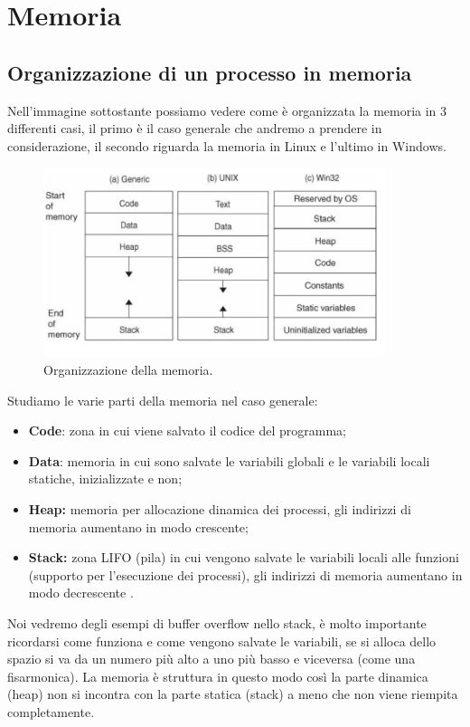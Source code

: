\section{Memoria}
\subsection{Organizzazione di un processo in memoria}
Nell'immagine sottostante possiamo vedere come è organizzata la memoria in 3 differenti casi, il primo è il caso generale che andremo a prendere in considerazione, il secondo riguarda la memoria in Linux e l'ultimo in Windows.

\begin{figure}[H]
    \centering
    \includegraphics[width=10cm, keepaspectratio]{capitoli/secure_coding/img/cap_2/memoria.png}
    \caption{Organizzazione della memoria.}\label{fig:org_memoria}
\end{figure}
Studiamo le varie parti della memoria nel caso generale:
\begin{itemize}
    \item \textbf{Code}: zona in cui viene salvato il codice del programma;
    \item \textbf{Data}: memoria  in cui sono salvate le variabili globali e le variabili locali statiche, inizializzate e non;
    \item \textbf{Heap:} memoria per allocazione dinamica dei processi, gli indirizzi di memoria aumentano in modo crescente;
    \item \textbf{Stack:} zona LIFO (pila) in cui vengono salvate le variabili locali alle funzioni (supporto per l'esecuzione dei processi), gli indirizzi di memoria aumentano in modo decrescente .
\end{itemize}
Noi vedremo degli esempi di buffer overflow nello stack, è molto importante ricordarsi come funziona e come vengono salvate le variabili, se si alloca dello spazio si va da un numero più alto a uno più basso e viceversa (come una fisarmonica). La memoria è struttura in questo modo così la parte dinamica (heap) non si incontra con la parte statica (stack) a meno che non viene riempita completamente.\\
